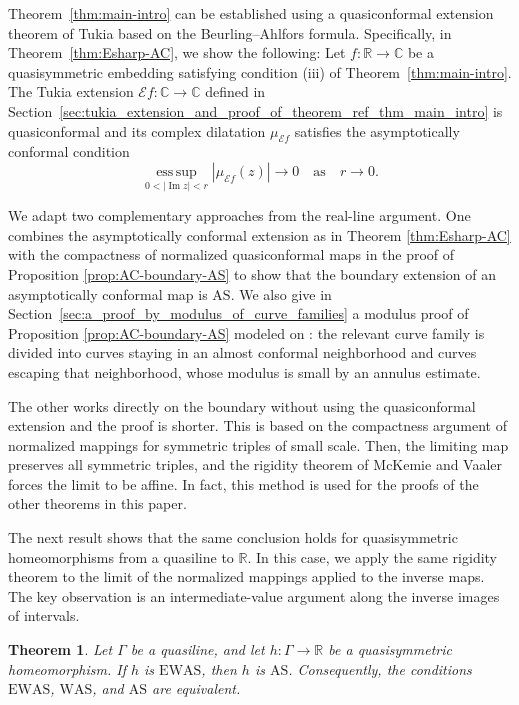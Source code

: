 \documentclass[11pt]{amsart}
\numberwithin{equation}{section}
\newtheorem{theorem}{Theorem}[section]
\theoremstyle{definition} %
\theoremstyle{remarkstyle}
\newcommand{\R}{\mathbb{R}}
\newcommand{\C}{\mathbb{C}}
\newcommand{\esssup}{\operatorname*{ess\,sup}}
\begin{document}
Theorem~\ref{thm:main-intro} can be established using a quasiconformal extension theorem of Tukia \cite{TukiaExtension} based on the Beurling--Ahlfors formula.
Specifically, in Theorem~\ref{thm:Esharp-AC}, we show the following:
Let $f\colon\R\to\C$ be a quasisymmetric embedding satisfying condition \textup{(iii)} of Theorem~\ref{thm:main-intro}.  
The Tukia extension $\mathcal Ef\colon\C\to\C$ defined in Section~\ref{sec:tukia_extension_and_proof_of_theorem_ref_thm_main_intro} is quasiconformal and its complex dilatation $\mu_{\mathcal Ef}$ satisfies the asymptotically conformal condition
\[
 \esssup_{0<|\operatorname{Im}z|<r}
 |\mu_{\mathcal Ef}(z)| \to 0 \quad \text{as}\quad r \to 0.
\]

We adapt two complementary approaches from the real-line argument.  
One combines the asymptotically conformal extension as in Theorem \ref{thm:Esharp-AC} with the compactness of normalized quasiconformal maps in the proof of Proposition \ref{prop:AC-boundary-AS} to show that the boundary extension of an asymptotically conformal map is $\mathrm{AS}$.  
We also give in Section~\ref{sec:a_proof_by_modulus_of_curve_families} a modulus proof of Proposition \ref{prop:AC-boundary-AS} modeled on \cite[Theorem~3.1]{BraniaYang}: the relevant curve family is divided into curves staying in an almost conformal neighborhood and curves escaping that neighborhood, whose modulus is small by an annulus estimate.

The other works directly on the boundary without using the quasiconformal extension and the proof is shorter. 
This is based on the compactness argument of normalized mappings for symmetric triples of small scale. 
Then, the limiting map preserves all symmetric triples, and the rigidity theorem of McKemie and Vaaler \cite{McKemieVaaler} forces the limit to be affine. 
In fact, this method is used for the proofs of the other theorems in this paper.

The next result shows that the same conclusion holds for quasisymmetric homeomorphisms from a quasiline to $\mathbb R$.
In this case, we apply the same rigidity theorem to the limit of the normalized mappings applied to the inverse maps. The key observation is an intermediate-value argument along the inverse images of intervals.

\begin{theorem}\label{thm:onto-line-intro}
Let $\Gamma$ be a quasiline, and let $h\colon\Gamma\to\R$ be a quasisymmetric homeomorphism.  
If $h$ is $\mathrm{EWAS}$, then $h$ is $\mathrm{AS}$. Consequently, the conditions $\mathrm{EWAS}$, $\mathrm{WAS}$, and $\mathrm{AS}$ are equivalent.
\end{theorem}
\end{document}
